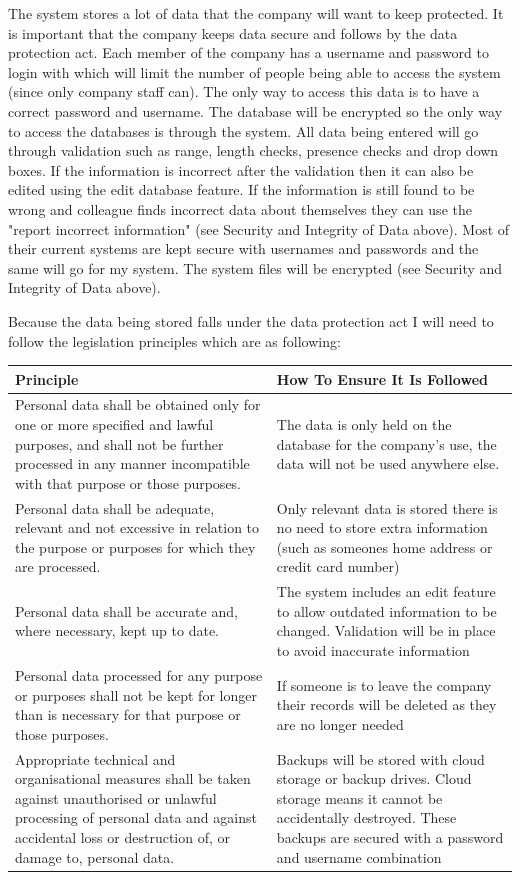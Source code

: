 The system stores a lot of data that the company will want to keep protected. It is important that the company keeps data secure and follows by the data protection act. Each member of the company has a username and password to login with which will limit the number of people being able to access the system (since only company staff can). The only way to access this data is to have a correct password and username. The database will be encrypted so the only way to access the databases is through the system. All data being entered will go through validation such as range, length checks, presence checks and drop down boxes. If the information is incorrect after the validation then it can also be edited using the edit database feature. If the information is still found to be wrong and colleague finds incorrect data about themselves they can use the "report incorrect information" (see Security and Integrity of Data above). Most of their current systems are kept secure with usernames and passwords and the same will go for my system. The system files will be encrypted (see Security and Integrity of Data above).

Because the data being stored falls under the data protection act I will need to follow the legislation principles which are as following:


\begin{center}
    \begin{tabular}{|p{5cm}|p{6cm}|}
        \hline
        \textbf{Principle} & \textbf{How To Ensure It Is Followed}\\ \hline
Personal data shall be obtained only for one or more specified and lawful purposes, and shall not be further processed in any manner incompatible with that purpose or those purposes. & The data is only held on the database for the company's use, the data will not be used anywhere else. \\ \hline
Personal data shall be adequate, relevant and not excessive in relation to the purpose or purposes for which they are processed. & Only relevant data is stored there is no need to store extra information (such as someones home address or credit card number) \\ \hline
Personal data shall be accurate and, where necessary, kept up to date. & The system includes an edit feature to allow outdated information to be changed. Validation will be in place to avoid inaccurate information \\ \hline
Personal data processed for any purpose or purposes shall not be kept for longer than is necessary for that purpose or those purposes. & If someone is to leave the company their records will be deleted as they are no longer needed \\ \hline
Appropriate technical and organisational measures shall be taken against unauthorised or unlawful processing of personal data and against accidental loss or destruction of, or damage to, personal data. & Backups will be stored with cloud storage or backup drives. Cloud storage means it cannot be accidentally destroyed. These backups are secured with a password and username combination \\ \hline
    \end{tabular}
\end{center}

